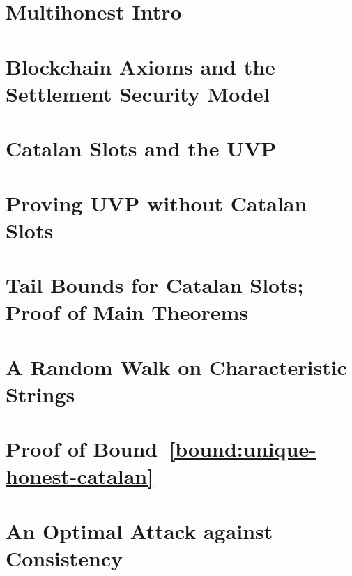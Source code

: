 \chapter{Multihonest Intro}\label{ch:intro-multihonest}


\chapter{Blockchain Axioms and the Settlement Security Model}\label{sec:model-multihonest}


\chapter{Catalan Slots and the UVP}\label{sec:catalan}\label{sec:definitions-multihonest}





\chapter{Proving UVP without Catalan Slots}\label{sec:fork-framework}



\chapter{Tail Bounds for Catalan Slots; Proof of Main Theorems}\label{sec:bounds-main-proofs-multihonest}


\chapter{A Random Walk on Characteristic Strings}\label{sec:rand-walks}
 


\chapter{Proof of \texorpdfstring{Bound~\ref{bound:unique-honest-catalan}}{the First Tail Bound} }\label{sec:estimates-multihonest}



\chapter{An Optimal Attack against Consistency}\label{sec:opt-adversary}



